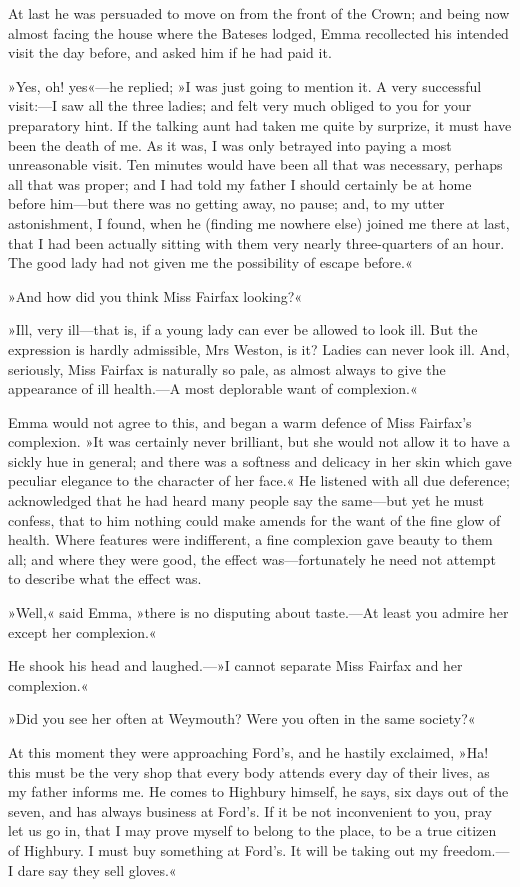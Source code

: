 At last he was persuaded to move on from the front of the Crown; and being now almost facing the house where the Bateses lodged, Emma recollected his intended visit the day before, and asked him if he had paid it.

»Yes, oh! yes«—he replied; »I was just going to mention it. A very successful visit:—I saw all the three ladies; and felt very much obliged to you for your preparatory hint. If the talking aunt had taken me quite by surprize, it must have been the death of me. As it was, I was only betrayed into paying a most unreasonable visit. Ten minutes would have been all that was necessary, perhaps all that was proper; and I had told my father I should certainly be at home before him—but there was no getting away, no pause; and, to my utter astonishment, I found, when he (finding me nowhere else) joined me there at last, that I had been actually sitting with them very nearly three-quarters of an hour. The good lady had not given me the possibility of escape before.«

»And how did you think Miss Fairfax looking?«

»Ill, very ill—that is, if a young lady can ever be allowed to look ill. But the expression is hardly admissible, Mrs Weston, is it? Ladies can never look ill. And, seriously, Miss Fairfax is naturally so pale, as almost always to give the appearance of ill health.—A most deplorable want of complexion.«

Emma would not agree to this, and began a warm defence of Miss Fairfax's complexion. »It was certainly never brilliant, but she would not allow it to have a sickly hue in general; and there was a softness and delicacy in her skin which gave peculiar elegance to the character of her face.« He listened with all due deference; acknowledged that he had heard many people say the same—but yet he must confess, that to him nothing could make amends for the want of the fine glow of health. Where features were indifferent, a fine complexion gave beauty to them all; and where they were good, the effect was—fortunately he need not attempt to describe what the effect was.

»Well,« said Emma, »there is no disputing about taste.—At least you admire her except her complexion.«

He shook his head and laughed.—»I cannot separate Miss Fairfax and her complexion.«

»Did you see her often at Weymouth? Were you often in the same society?«

At this moment they were approaching Ford's, and he hastily exclaimed, »Ha! this must be the very shop that every body attends every day of their lives, as my father informs me. He comes to Highbury himself, he says, six days out of the seven, and has always business at Ford's. If it be not inconvenient to you, pray let us go in, that I may prove myself to belong to the place, to be a true citizen of Highbury. I must buy something at Ford's. It will be taking out my freedom.—I dare say they sell gloves.«

